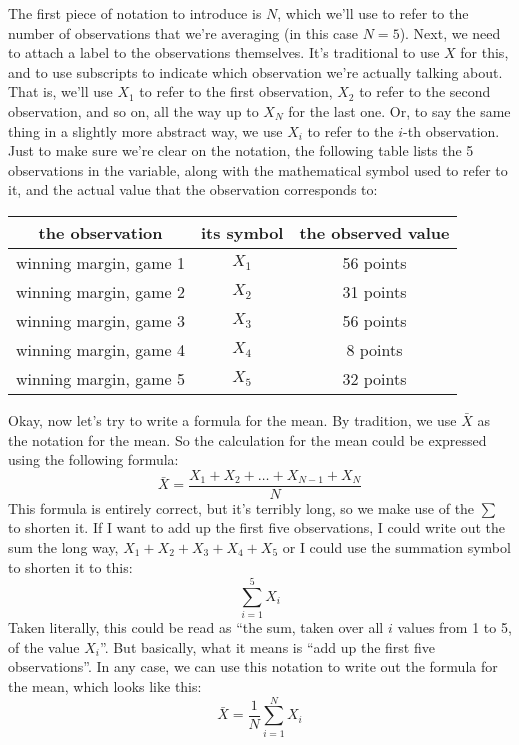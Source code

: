 The first piece of notation to introduce is $N$, which we'll use to refer to the number of observations that we're averaging (in this case $N = 5$). Next, we need to attach a label to the observations themselves. It's traditional to use $X$ for this, and to use subscripts to indicate which observation we're actually talking about. That is, we'll use $X_1$ to refer to the first observation, $X_2$ to refer to the second observation, and so on, all the way up to $X_N$ for the last one. Or, to say the same thing in a slightly more abstract way, we use $X_i$ to refer to the $i$-th observation. Just to make sure we're clear on the notation, the following table lists the 5 observations in the  variable, along with the mathematical symbol used to refer to it, and the actual value that the observation corresponds to:

\begin{center}
\begin{tabular}{ccc}
the observation & its symbol & the observed value \\ \hline
winning margin, game 1 & $X_1$ & 56 points \\
winning margin, game 2 & $X_2$ & 31 points \\
winning margin, game 3 & $X_3$ & 56 points \\
winning margin, game 4 & $X_4$ & 8 points \\
winning margin, game 5 & $X_5$ & 32 points \\
\end{tabular}
\end{center}

\noindent
Okay, now let's try to write a formula for the mean. By tradition, we use $\bar{X}$ as the notation for the mean. So the calculation for the mean could be expressed using the following formula:
$$
\bar{X} = \frac{X_1 + X_2 + \ldots + X_{N-1} + X_N}{N}
$$
This formula is entirely correct, but it's terribly long, so we make use of the  $\scriptstyle\sum$ to shorten it. If I want to add up the first five observations, I could write out the sum the long way, $X_1 + X_2 + X_3 + X_4 +X_5$ or I could use the summation symbol to shorten it to this:
$$
\sum_{i=1}^5 X_i
$$
Taken literally, this could be read as ``the sum, taken over all $i$ values from 1 to 5, of the value $X_i$''. But basically, what it means is ``add up the first five observations''. In any case, we can use this notation to write out the formula for the mean, which looks like this:
$$
\bar{X} = \frac{1}{N} \sum_{i=1}^N X_i 
$$

